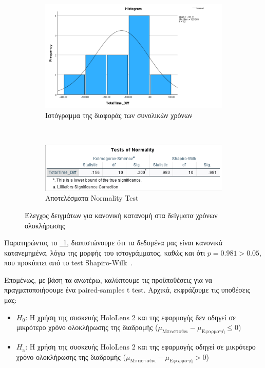 \begin{figure}[!h]
    \centering
    \begin{subfigure}{0.8\textwidth}
        \centering
        \includegraphics[width=1\linewidth]{./images/SA_Histogram_TotalTimeDiff.png}
        \caption{Ιστόγραμμα της διαφοράς των συνολικών χρόνων}
    \end{subfigure}%
    \\
    \begin{subfigure}{0.8\textwidth}
        \centering
        \includegraphics[width=1\linewidth]{images/SA_NormalityTest_TotalTimeDiff.png}
        \caption{Αποτελέσματα Normality Test}
    \end{subfigure}%
    \caption{Έλεγχος δειγμάτων για κανονική κατανομή στα δείγματα χρόνων ολοκλήρωσης}\label{fig:SANormalDistribution}
\end{figure}

Παρατηρώντας το \hyperref[fig:SANormalDistribution]{\schema~\ref*{fig:SANormalDistribution}}, διαπιστώνουμε ότι τα δεδομένα μας είναι κανονικά κατανεμημένα, λόγω της μορφής του ιστογράμματος, καθώς και ότι $p = 0.981 > 0.05$, που προκύπτει από το test Shapiro-Wilk~\cite{shapiro_1965_an}.

Επομένως, με βάση τα ανωτέρω, καλύπτουμε τις προϋποθέσεις για να πραγματοποιήσουμε ένα paired-samples t test. Αρχικά, εκφράζουμε τις υποθέσεις μας:
\begin{itemize}
    \item \textbf{$H_0$}: Η χρήση της συσκευής HoloLens 2 και της εφαρμογής δεν οδηγεί σε μικρότερο χρόνο ολοκλήρωσης της διαδρομής ($\mu_{\text{Μπαστούνι}} - \mu_{\text{Εφαρμογή}} \le 0$)
    \item \textbf{$H_{\text{a}}$}: Η χρήση της συσκευής HoloLens 2 και της εφαρμογής οδηγεί σε μικρότερο χρόνο ολοκλήρωσης της διαδρομής ($\mu_{\text{Μπαστούνι}} - \mu_{\text{Εφαρμογή}} > 0$)
\end{itemize}

